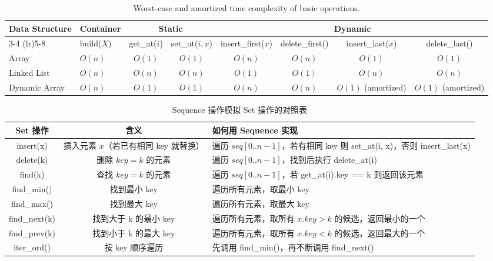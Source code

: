 \documentclass[10.5pt,hyperref,a4paper,UTF8]{ctexart}
\begin{document}
\begin{table}[h!]
\centering
\renewcommand{\arraystretch}{1.2}
\begin{tabular}{llcccccc}
\toprule
\multirow{2}{*}{Data Structure} & \multirow{2}{*}{Container} & 
\multicolumn{2}{c}{Static} & \multicolumn{4}{c}{Dynamic} \\
\cmidrule(lr){3-4} \cmidrule(lr){5-8}
& build($X$) & get\_at($i$) & set\_at($i,x$) & insert\_first($x$) & delete\_first() & insert\_last($x$) & delete\_last() \\
\midrule
Array & $O(n)$ & $O(1)$ & $O(1)$ & $O(n)$ & $O(n)$ & $O(1)$ & $O(1)$ \\
Linked List & $O(n)$ & $O(n)$ & $O(n)$ & $O(1)$ & $O(1)$ & $O(n)$ & $O(n)$ \\
Dynamic Array & $O(n)$ & $O(1)$ & $O(1)$ & $O(n)$ & $O(n)$ & $O(1)$ (amortized) & $O(1)$ (amortized) \\
\bottomrule
\end{tabular}
\caption{Worst-case and amortized time complexity of basic operations.}
\end{table}

\begin{table}[ht]
\centering
\begin{tabularx}{\textwidth}{|c|c|X|}
\hline
\textbf{Set 操作} & \textbf{含义} & \textbf{如何用 Sequence 实现} \\
\hline
insert(x)   & 插入元素 $x$（若已有相同 key 就替换） & 遍历 $seq[0..n-1]$，若有相同 key 则 set\_at(i, x)，否则 insert\_last(x) \\
\hline
delete(k)   & 删除 $key=k$ 的元素 & 遍历 $seq[0..n-1]$，找到后执行 delete\_at(i) \\
\hline
find(k)     & 查找 $key=k$ 的元素 & 遍历 $seq[0..n-1]$，若 get\_at(i).key == k 则返回该元素 \\
\hline
find\_min() & 找到最小 key & 遍历所有元素，取最小 key \\
\hline
find\_max() & 找到最大 key & 遍历所有元素，取最大 key \\
\hline
find\_next(k) & 找到大于 k 的最小 key & 遍历所有元素，取所有 $x.key > k$ 的候选，返回最小的一个 \\
\hline
find\_prev(k) & 找到小于 k 的最大 key & 遍历所有元素，取所有 $x.key < k$ 的候选，返回最大的一个 \\
\hline
iter\_ord() & 按 key 顺序遍历 & 先调用 find\_min()，再不断调用 find\_next() \\
\hline
\end{tabularx}
\caption{Sequence 操作模拟 Set 操作的对照表}
\end{table}
\newpage
{}
\end{document}
